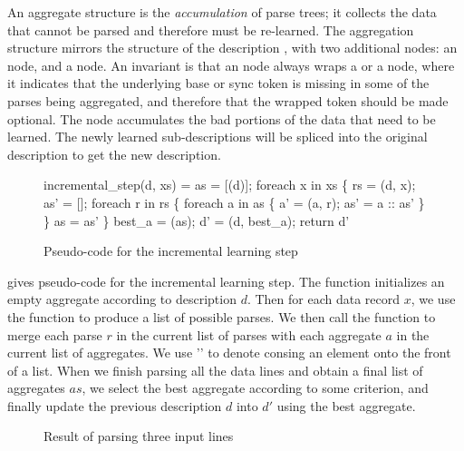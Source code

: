 An aggregate structure is the {\em accumulation} of parse trees; it
collects the data that cannot be parsed and therefore must be re-learned.
The aggregation structure mirrors the structure of the description , 
with two additional nodes: an  node, and a  node. 
An invariant is that an  node always wraps a  or a  node,
where it indicates that the underlying base or sync token is missing
in some of the parses being aggregated, and therefore that the wrapped
token should be made optional. 
The  node accumulates the bad portions of the data that need
to be learned. The newly learned sub-descriptions 
will be spliced into the original description to get the new description. 

\begin{figure}[t]
\begin{codebox}
incremental_step(d, xs) =
  as = [(d)];
  foreach x in xs \{
    rs = (d, x);
    as' = [];
    foreach r in rs \{
      foreach a in as \{
        a' = (a, r); 
        as' = a :: as'
      \}
    \}
    as = as'
  \} 
  best_a = (as);
  d' = (d, best_a);  
  return d'
\end{codebox}
\caption{Pseudo-code for the incremental learning step}
\label{fig:inc-learning}
\end{figure}

 gives pseudo-code for the incremental
learning step.
The  function initializes an empty aggregate
according to description $d$.  
Then for each data record $x$, we use the  function to
produce a list  of possible parses.
We then call the  function to merge
each parse $r$ in the current list of parses with each aggregate $a$ in the
current list of aggregates. We use '\cd{::}' to denote 
consing an element onto the front of a list. 
When we finish
parsing all the data lines and obtain a final list of aggregates $as$, we select
the best aggregate according to some criterion, and finally update the previous description
$d$ into $d'$ using the best aggregate. 

\begin{figure}[t]
\begin{center}
\caption{Result of parsing three input lines}\label{fig:parse}
\end{center}
\end{figure}

